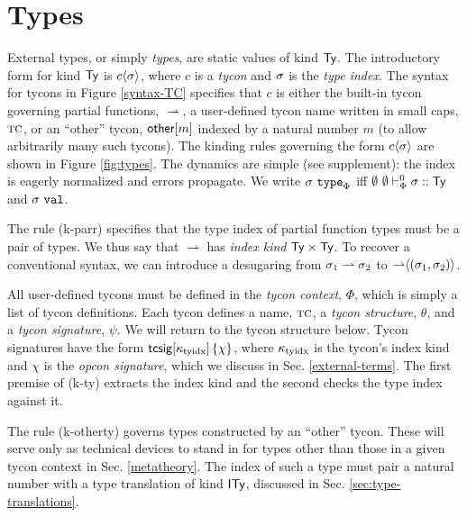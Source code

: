 \documentclass[10pt,preprint]{sigplanconf}
\newcommand{\rulename}[1]{(#1)}
\begin{document}
\section{Types}\label{types}


External types, or simply \emph{types}, are static values of kind ${\sf Ty}$. The introductory form for kind ${\sf Ty}$ is ${c}\langle\sigma\rangle$, where $c$ is a \emph{tycon} and $\sigma$ is the \emph{type index}. The syntax  for tycons in Figure \ref{syntax-TC} specifies that $c$ is either the built-in tycon governing partial functions, $\rightharpoonup$, a user-defined tycon name written in small caps, $\textsc{tc}$, or an ``other'' tycon, ${\sf other}[m]$ indexed by a natural number $m$ (to allow arbitrarily many such tycons). The kinding rules governing the form ${c}\langle\sigma\rangle$ are shown in Figure \ref{fig:types}. The dynamics are simple (see supplement): the index is eagerly normalized and errors propagate. We write $\sigma~\texttt{type}_{\Phi}$  iff $\emptyset~\emptyset \vdash_{\Phi}^{0} \sigma :: {\sf Ty}$ and $\sigma~\mathtt{val}$. 

The rule \rulename{k-parr} specifies that the type index of partial function types must be a pair of types. We thus say that $\rightharpoonup$ has \emph{index kind} ${\sf Ty} \times {\sf Ty}$. To recover a conventional syntax, we can introduce a desugaring from $\sigma_1 \rightharpoonup \sigma_2$ to ${\rightharpoonup}\langle(\sigma_1, \sigma_2)\rangle$. %


All user-defined tycons must be defined in the \emph{tycon context}, $\Phi$, which is simply a list of tycon definitions. Each tycon defines a name, $\textsc{tc}$, a \emph{tycon structure}, $\theta$, and a \emph{tycon signature}, $\psi$. We will return to the tycon structure below. Tycon signatures have the form ${\sf tcsig}[\kappa_\text{tyidx}]\,\{\chi\}$, where $\kappa_\text{tyidx}$ is the tycon's index kind and $\chi$ is the \emph{opcon signature}, which we   discuss in Sec. \ref{external-terms}. The first premise of \rulename{k-ty} extracts the index kind and the second checks the type index against it. 

The rule (k-otherty) governs types constructed by an ``other'' tycon. These will serve only as technical devices to stand in for types other than those in a given tycon context in Sec. \ref{metatheory}. The index of such a type must pair a natural number with a type translation of kind ${\sf ITy}$, discussed in Sec. \ref{sec:type-translations}.
\end{document}
